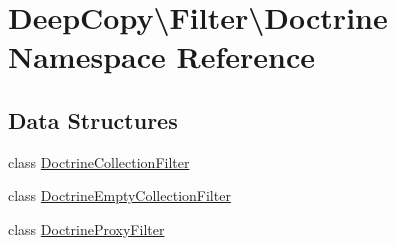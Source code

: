 \hypertarget{namespace_deep_copy_1_1_filter_1_1_doctrine}{}\section{Deep\+Copy\textbackslash{}Filter\textbackslash{}Doctrine Namespace Reference}
\label{namespace_deep_copy_1_1_filter_1_1_doctrine}
\subsection*{Data Structures}
\begin{DoxyCompactItemize}
\item 
class \mbox{\hyperlink{class_deep_copy_1_1_filter_1_1_doctrine_1_1_doctrine_collection_filter}{Doctrine\+Collection\+Filter}}
\item 
class \mbox{\hyperlink{class_deep_copy_1_1_filter_1_1_doctrine_1_1_doctrine_empty_collection_filter}{Doctrine\+Empty\+Collection\+Filter}}
\item 
class \mbox{\hyperlink{class_deep_copy_1_1_filter_1_1_doctrine_1_1_doctrine_proxy_filter}{Doctrine\+Proxy\+Filter}}
\end{DoxyCompactItemize}
